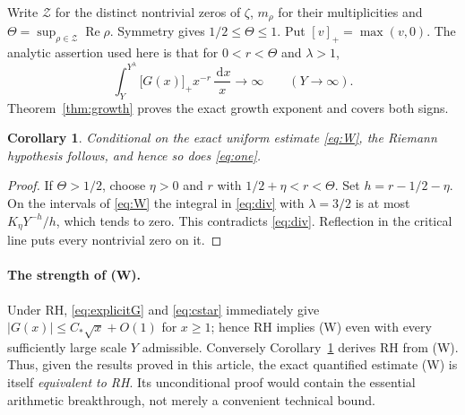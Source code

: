 \documentclass[11pt,a4paper]{article}
\newtheorem{corollary}[theorem]{Corollary}
\newcommand{\Znt}{\mathcal Z}
\newcommand{\dd}{\,\mathrm d}
\newcommand{\Rea}{\operatorname{Re}}
\newcommand{\pos}[1]{\bigl[#1\bigr]_+}
\begin{document}
Write $\Znt$ for the distinct nontrivial zeros of $\zeta$, $m_\rho$ for their multiplicities and $\Theta=\sup_{\rho\in\Znt}\Rea\rho$. Symmetry gives $1/2\le\Theta\le1$. Put $[v]_+=\max(v,0)$. The analytic assertion used here is that for $0<r<\Theta$ and $\lambda>1$,
\begin{equation}\label{eq:div}
  \int_Y^{Y^\lambda}\pos{G(x)}x^{-r}\,\frac{\dd x}{x}\longrightarrow\infty
   \qquad(Y\to\infty).
\end{equation}
Theorem~\ref{thm:growth} proves the exact growth exponent and covers both signs.

\begin{corollary}\label{cor:rh}
\emph{Conditional on the exact uniform estimate} \eqref{eq:W}, the Riemann hypothesis follows, and hence so does \eqref{eq:one}.
\end{corollary}
\begin{proof}
If $\Theta>1/2$, choose $\eta>0$ and $r$ with $1/2+\eta<r<\Theta$. Set $h=r-1/2-\eta$. On the intervals of \eqref{eq:W} the integral in \eqref{eq:div} with $\lambda=3/2$ is at most $K_\eta Y^{-h}/h$, which tends to zero. This contradicts \eqref{eq:div}. Reflection in the critical line puts every nontrivial zero on it.
\end{proof}

\paragraph{The strength of (W).}
Under RH, \eqref{eq:explicitG} and \eqref{eq:cstar} immediately give
$|G(x)|\le C_*\sqrt{x}+O(1)$ for $x\ge1$; hence RH implies (W) even with every sufficiently large scale $Y$ admissible. Conversely Corollary~\ref{cor:rh} derives RH from (W). Thus, given the results proved in this article, the exact quantified estimate (W) is itself \emph{equivalent to RH}. Its unconditional proof would contain the essential arithmetic breakthrough, not merely a convenient technical bound.
\end{document}
